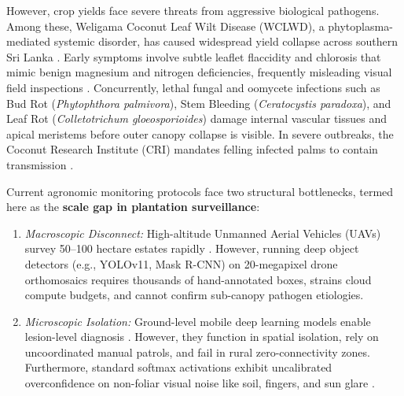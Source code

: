 \documentclass[conference,a4paper]{IEEEtran}
\begin{document}
However, crop yields face severe threats from aggressive biological pathogens. Among these, Weligama Coconut Leaf Wilt Disease (WCLWD), a phytoplasma-mediated systemic disorder, has caused widespread yield collapse across southern Sri Lanka \cite{b5}. Early symptoms involve subtle leaflet flaccidity and chlorosis that mimic benign magnesium and nitrogen deficiencies, frequently misleading visual field inspections \cite{b11,b18}. Concurrently, lethal fungal and oomycete infections such as Bud Rot (\textit{Phytophthora palmivora}), Stem Bleeding (\textit{Ceratocystis paradoxa}), and Leaf Rot (\textit{Colletotrichum gloeosporioides}) damage internal vascular tissues and apical meristems before outer canopy collapse is visible. In severe outbreaks, the Coconut Research Institute (CRI) mandates felling infected palms to contain transmission \cite{b6}.

Current agronomic monitoring protocols face two structural bottlenecks, termed here as the \textbf{scale gap in plantation surveillance}:
\begin{enumerate}[\IEEEsetlabelwidth{1)}]
    \setlength{\itemsep}{0pt}\setlength{\parskip}{0pt}
    \item \textit{Macroscopic Disconnect:} High-altitude Unmanned Aerial Vehicles (UAVs) survey 50--100 hectare estates rapidly \cite{b10,b13}. However, running deep object detectors (e.g., YOLOv11, Mask R-CNN) on 20-megapixel drone orthomosaics requires thousands of hand-annotated boxes, strains cloud compute budgets, and cannot confirm sub-canopy pathogen etiologies.
    \item \textit{Microscopic Isolation:} Ground-level mobile deep learning models enable lesion-level diagnosis \cite{b3,b9}. However, they function in spatial isolation, rely on uncoordinated manual patrols, and fail in rural zero-connectivity zones. Furthermore, standard softmax activations exhibit uncalibrated overconfidence on non-foliar visual noise like soil, fingers, and sun glare \cite{b12,b19}.
\end{enumerate}
\end{document}
